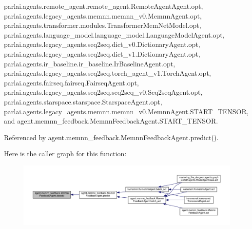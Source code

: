 parlai.\+agents.\+remote\+\_\+agent.\+remote\+\_\+agent.\+Remote\+Agent\+Agent.\+opt, parlai.\+agents.\+legacy\+\_\+agents.\+memnn.\+memnn\+\_\+v0.\+Memnn\+Agent.\+opt, parlai.\+agents.\+transformer.\+modules.\+Transformer\+Mem\+Net\+Model.\+opt, parlai.\+agents.\+language\+\_\+model.\+language\+\_\+model.\+Language\+Model\+Agent.\+opt, parlai.\+agents.\+legacy\+\_\+agents.\+seq2seq.\+dict\+\_\+v0.\+Dictionary\+Agent.\+opt, parlai.\+agents.\+legacy\+\_\+agents.\+seq2seq.\+dict\+\_\+v1.\+Dictionary\+Agent.\+opt, parlai.\+agents.\+ir\+\_\+baseline.\+ir\+\_\+baseline.\+Ir\+Baseline\+Agent.\+opt, parlai.\+agents.\+legacy\+\_\+agents.\+seq2seq.\+torch\+\_\+agent\+\_\+v1.\+Torch\+Agent.\+opt, parlai.\+agents.\+fairseq.\+fairseq.\+Fairseq\+Agent.\+opt, parlai.\+agents.\+legacy\+\_\+agents.\+seq2seq.\+seq2seq\+\_\+v0.\+Seq2seq\+Agent.\+opt, parlai.\+agents.\+starspace.\+starspace.\+Starspace\+Agent.\+opt, parlai.\+agents.\+legacy\+\_\+agents.\+memnn.\+memnn\+\_\+v0.\+Memnn\+Agent.\+S\+T\+A\+R\+T\+\_\+\+T\+E\+N\+S\+OR, and agent.\+memnn\+\_\+feedback.\+Memnn\+Feedback\+Agent.\+S\+T\+A\+R\+T\+\_\+\+T\+E\+N\+S\+OR.



Referenced by agent.\+memnn\+\_\+feedback.\+Memnn\+Feedback\+Agent.\+predict().

Here is the caller graph for this function\+:
\nopagebreak
\begin{figure}[H]
\begin{center}
\leavevmode
\includegraphics[width=350pt]{classagent_1_1memnn__feedback_1_1MemnnFeedbackAgent_af8ee1bfd956442c04bbc6cba45e4c549_icgraph}
\end{center}
\end{figure}
\mbox{\label{classagent_1_1memnn__feedback_1_1MemnnFeedbackAgent_a959cbfdba3d83ba7e8571ef999c57601}} 
